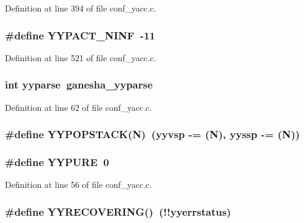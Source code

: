 Definition at line 394 of file conf\_\-yacc.c.
\subsubsection[{YYPACT\_\-NINF}]{\setlength{\rightskip}{0pt plus 5cm}\#define YYPACT\_\-NINF~-11}\label{conf__yacc_8c_62bf0ed0c4360b077071b5cf3177823b}




Definition at line 521 of file conf\_\-yacc.c.
\subsubsection[{yyparse}]{\setlength{\rightskip}{0pt plus 5cm}int yyparse~ganesha\_\-yyparse}\label{conf__yacc_8c_a23178cbe072d03b46f5c307f7918e7b}




Definition at line 62 of file conf\_\-yacc.c.
\subsubsection[{YYPOPSTACK}]{\setlength{\rightskip}{0pt plus 5cm}\#define YYPOPSTACK(N)~(yyvsp -= (N), yyssp -= (N))}\label{conf__yacc_8c_d2f9773cd9c031026b2ef4c1ee7be1be}


\subsubsection[{YYPURE}]{\setlength{\rightskip}{0pt plus 5cm}\#define YYPURE~0}\label{conf__yacc_8c_9fa797a1f3c4fc9b12d1e4d569612767}




Definition at line 56 of file conf\_\-yacc.c.
\subsubsection[{YYRECOVERING}]{\setlength{\rightskip}{0pt plus 5cm}\#define YYRECOVERING()~(!!yyerrstatus)}\label{conf__yacc_8c_d860e18ca4b79fc589895b531bdb7948}




